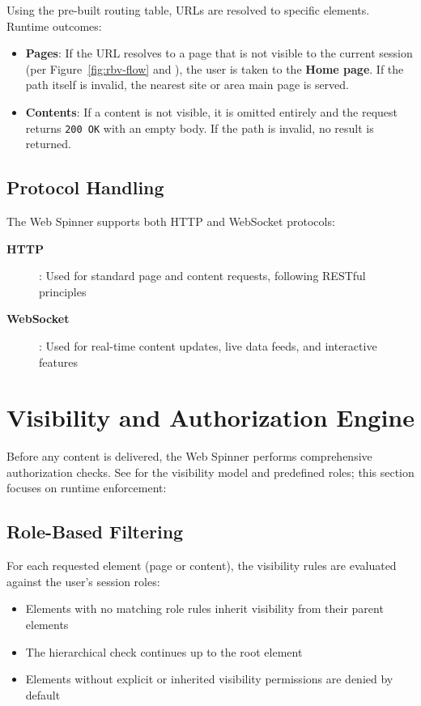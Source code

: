 Using the pre-built routing table, URLs are resolved to specific \wbdl{} elements. Runtime outcomes:
\begin{itemize}
	\item \textbf{Pages}: If the URL resolves to a page that is not visible to the current session (per Figure~\ref{fig:rbv-flow} and ), the user is taken to the \textbf{Home page}. If the path itself is invalid, the nearest site or area main page is served.
	\item \textbf{Contents}: If a content is not visible, it is omitted entirely and the request returns \texttt{200 OK} with an empty body. If the path is invalid, no result is returned.
\end{itemize}

\subsection{Protocol Handling}

The Web Spinner supports both HTTP and WebSocket protocols:
\begin{description}
	\item[\textbf{HTTP}]: Used for standard page and content requests, following RESTful principles
	\item[\textbf{WebSocket}]: Used for real-time content updates, live data feeds, and interactive features
\end{description}

\section{Visibility and Authorization Engine}
\label{sec:authorization-engine}

Before any content is delivered, the Web Spinner performs comprehensive authorization checks. See  for the visibility model and predefined roles; this section focuses on runtime enforcement:

\subsection{Role-Based Filtering}

For each requested element (page or content), the visibility rules are evaluated against the user's session roles:
\begin{itemize}
	\item Elements with no matching role rules inherit visibility from their parent elements
	\item The hierarchical check continues up to the root element
	\item Elements without explicit or inherited visibility permissions are denied by default
\end{itemize}

